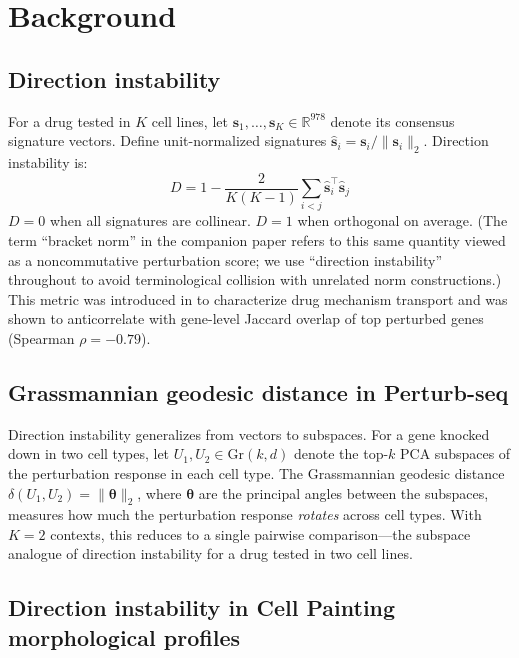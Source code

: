 \documentclass{article}
\begin{document}
\section{Background}

\subsection{Direction instability}

For a drug tested in $K$ cell lines, let $\mathbf{s}_1, \ldots,
\mathbf{s}_K \in \mathbb{R}^{978}$ denote its consensus signature vectors.
Define unit-normalized signatures $\hat{\mathbf{s}}_i = \mathbf{s}_i /
\|\mathbf{s}_i\|_2$. Direction instability is:
\begin{equation}
  D = 1 - \frac{2}{K(K-1)} \sum_{i < j}
    \hat{\mathbf{s}}_i^\top \hat{\mathbf{s}}_j
  \label{eq:direction_instability}
\end{equation}
$D = 0$ when all signatures are collinear. $D = 1$ when orthogonal on average.
(The term ``bracket norm'' in the companion paper
\citep{tower2026bracket} refers to this same quantity viewed as a
noncommutative perturbation score; we use ``direction instability''
throughout to avoid terminological collision with unrelated norm
constructions.)
This metric was introduced in \citet{tower2026bracket} to characterize drug mechanism
transport and was shown to anticorrelate with gene-level Jaccard overlap of
top perturbed genes (Spearman $\rho = -0.79$).

\subsection{Grassmannian geodesic distance in Perturb-seq}

Direction instability generalizes from vectors to subspaces. For a gene
knocked down in two cell types, let $U_1, U_2 \in \text{Gr}(k, d)$ denote
the top-$k$ PCA subspaces of the perturbation response in each cell type.
The Grassmannian geodesic distance $\delta(U_1, U_2) =
\|\boldsymbol{\theta}\|_2$, where $\boldsymbol{\theta}$ are the principal
angles between the subspaces, measures how much the perturbation response
\emph{rotates} across cell types. With $K = 2$ contexts, this reduces to a
single pairwise comparison---the subspace analogue of direction instability
for a drug tested in two cell lines.

\subsection{Direction instability in Cell Painting morphological profiles}
\end{document}
